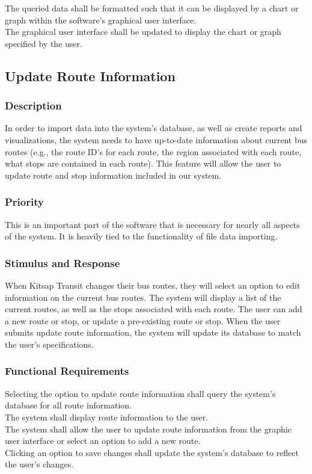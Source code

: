The queried data shall be formatted such that it can be displayed by a chart or graph within the software's graphical user interface.\\

The graphical user interface shall be updated to display the chart or graph specified by the user.

\subsection{Update Route Information}
\subsubsection{Description}
In order to import data into the system's database, as well as create reports and visualizations, the system needs to have up-to-date information about current bus routes (e.g., the route ID's for each route, the region associated with each route, what stops are contained in each route). This feature will allow the user to update route and stop information included in our system. 

\subsubsection{Priority}
This is an important part of the software that is necessary for nearly all aspects of the system. It is heavily tied to the functionality of file data importing.

\subsubsection{Stimulus and Response}
When Kitsap Transit changes their bus routes, they will select an option to edit information on the current bus routes. The system will display a list of the current routes, as well as the stops associated with each route. The user can add a new route or stop, or update a pre-existing route or stop. When the user submits update route information, the system will update its database to match the user's specifications.

\subsubsection{Functional Requirements}
Selecting the option to update route information shall query the system's database for all route information.\\
The system shall display route information to the user.\\

The system shall allow the user to update route information from the graphic user interface or select an option to add a new route. \\

Clicking an option to save changes shall update the system's database to reflect the user's changes.

